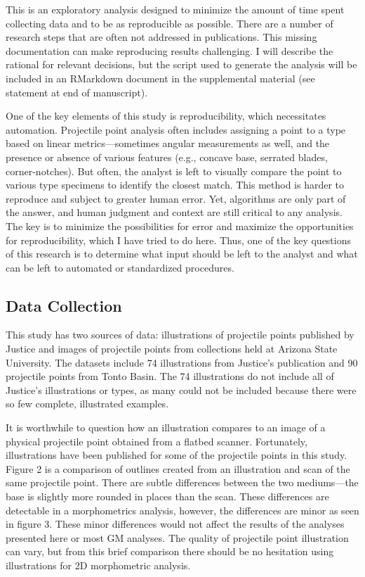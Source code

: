 \documentclass[letterpaper]{article}
\begin{document}
This is an exploratory analysis designed to minimize the amount of time spent collecting data and to be as reproducible as possible. There are a number of research steps that are often not addressed in publications. This missing documentation can make reproducing results challenging. I will describe the rational for relevant decisions, but the script used to generate the analysis will be included in an RMarkdown document in the supplemental material (see statement at end of manuscript).

One of the key elements of this study is reproducibility, which necessitates automation. Projectile point analysis often includes assigning a point to a type based on linear metrics---sometimes angular measurements as well, and the presence or absence of various features (e.g., concave base, serrated blades, corner-notches). But often, the analyst is left to visually compare the point to various type specimens to identify the closest match. This method is harder to reproduce and subject to greater human error. Yet, algorithms are only part of the answer, and human judgment and context are still critical to any analysis. The key is to minimize the possibilities for error and maximize the opportunities for reproducibility, which I have tried to do here. Thus, one of the key questions of this research is to determine what input should be left to the analyst and what can be left to automated or standardized procedures.

\hypertarget{data-collection}{%
\subsection*{Data Collection}\label{data-collection}}

This study has two sources of data: illustrations of projectile points published by Justice \autocite*{Justice2002-cf} and images of projectile points from collections held at Arizona State University. The datasets include 74 illustrations from Justice's publication and 90 projectile points from Tonto Basin. The 74 illustrations do not include all of Justice's illustrations or types, as many could not be included because there were so few complete, illustrated examples.

It is worthwhile to question how an illustration compares to an image of a physical projectile point obtained from a flatbed scanner. Fortunately, illustrations have been published for some of the projectile points in this study. Figure 2 is a comparison of outlines created from an illustration and scan of the same projectile point. There are subtle differences between the two mediums---the base is slightly more rounded in places than the scan. These differences are detectable in a morphometrics analysis, however, the differences are minor as seen in figure 3. These minor differences would not affect the results of the analyses presented here or most GM analyses. The quality of projectile point illustration can vary, but from this brief comparison there should be no hesitation using illustrations for 2D morphometric analysis.
\end{document}
